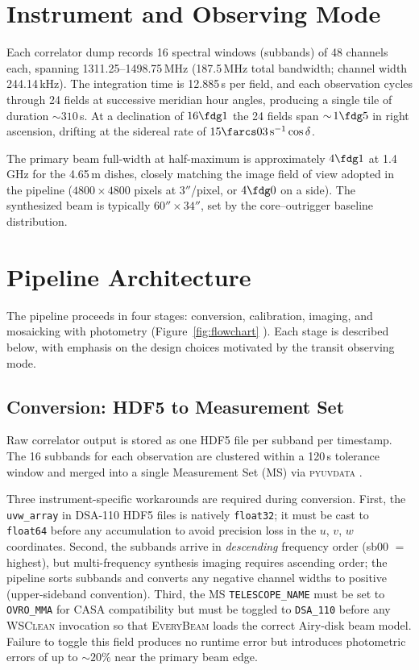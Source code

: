 \documentclass[twocolumn,11pt]{article}
\newcommand{\wsclean}{\textsc{WSClean}\xspace}
\newcommand{\casa}{\textsc{CASA}\xspace}
\newcommand{\everybeam}{\textsc{EveryBeam}\xspace}
\begin{document}
\section{Instrument and Observing Mode}\label{sec:instrument}

Each correlator dump records 16 spectral windows (subbands) of 48
channels each, spanning 1311.25--1498.75\,MHz (187.5\,MHz total
bandwidth; channel width 244.14\,kHz).  The integration time is
12.885\,s per field, and each observation cycles through 24 fields
at successive meridian hour angles, producing a single tile of
duration $\sim\!310$\,s.  At a declination of $16\fdg1$ the 24 fields
span $\sim\!1\fdg5$ in right ascension, drifting at the sidereal rate
of $15\farcs03\,\mathrm{s}^{-1}\cos\delta$.

The primary beam full-width at half-maximum is approximately
$4\fdg1$ at 1.4\,GHz for the 4.65\,m dishes, closely matching the
image field of view adopted in the pipeline ($4800\times4800$ pixels
at $3''$/pixel, or $4\fdg0$ on a side).  The synthesized beam is
typically $60''\times34''$, set by the core--outrigger baseline
distribution.


\section{Pipeline Architecture}\label{sec:pipeline}

The pipeline proceeds in four stages: conversion, calibration, imaging,
and mosaicking with photometry (Figure~\ref{fig:flowchart} %
).  Each stage is
described below, with emphasis on the design choices motivated by the
transit observing mode.

\subsection{Conversion: HDF5 to Measurement Set}\label{sec:conversion}

Raw correlator output is stored as one HDF5 file per subband per
timestamp.  The 16 subbands for each observation are clustered within a
120\,s tolerance window and merged into a single Measurement Set (MS)
via \textsc{pyuvdata} \citep{hazelton2017}.

Three instrument-specific workarounds are required during conversion.
First, the \texttt{uvw\_array} in DSA-110 HDF5 files is natively
\texttt{float32}; it must be cast to \texttt{float64} before any
accumulation to avoid precision loss in the $u$, $v$, $w$ coordinates.
Second, the subbands arrive in \emph{descending} frequency order (sb00
$=$ highest), but multi-frequency synthesis imaging requires ascending
order; the pipeline sorts subbands and converts any negative channel
widths to positive (upper-sideband convention).  Third, the MS
\texttt{TELESCOPE\_NAME} must be set to \texttt{OVRO\_MMA} for \casa
compatibility but must be toggled to \texttt{DSA\_110} before any
\wsclean invocation so that \everybeam loads the correct Airy-disk beam
model.  Failure to toggle this field produces no runtime error but
introduces photometric errors of up to $\sim\!20\%$ near the primary
beam edge.
\end{document}
